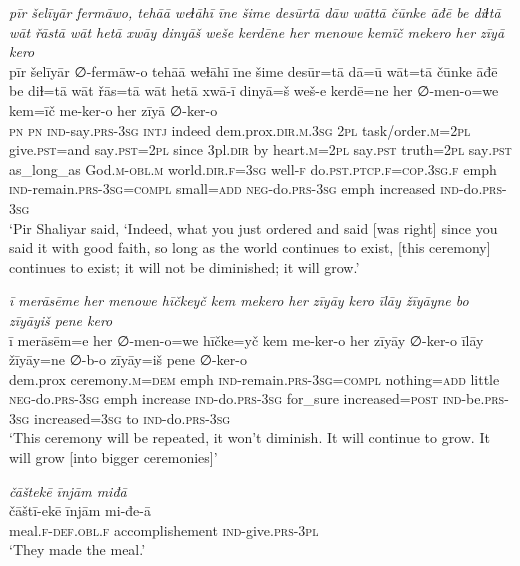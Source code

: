 \ea \label{ŽP.243}
\textit{pīr šelīyār fermāwo, tehāā weɫāhī īne šime desūrtā dāw wāttā čūnke āđē be diɫtā wāt řāstā wāt hetā xwāy dinyāš weše kerdēne her menowe kemīč mekero her zīyā kero} \\ 
\gll pīr šelīyār ∅-fermāw-o tehāā weɫāhī īne šime desūr=tā dā=ū wāt=tā čūnke āđē be diɫ=tā wāt řās=tā wāt hetā xwā-ī dinyā=š weš-e kerdē=ne her ∅-men-o=we kem=īč me-ker-o her zīyā ∅-ker-o \\ 
 \textsc{pn} \textsc{pn} \textsc{ind-}say\textsc{.prs}\textsc{-3sg} \textsc{intj} indeed dem.prox\textsc{.dir}\textsc{.m}\textsc{.3sg} \textsc{2pl} task/order\textsc{.m}=\textsc{2pl} give\textsc{.pst}=and say\textsc{.pst}=\textsc{2pl} since 3pl\textsc{.dir} by heart\textsc{.m}=\textsc{2pl} say\textsc{.pst} truth=\textsc{2pl} say\textsc{.pst} as\_long\_as God\textsc{.m}\textsc{-obl}\textsc{.m} world\textsc{.dir}\textsc{.f}\textsc{=3sg} well\textsc{-f} do\textsc{.pst}\textsc{.ptcp}\textsc{.f}\textsc{=cop}\textsc{.3sg}\textsc{.f} emph \textsc{ind-}remain\textsc{.prs}\textsc{-3sg}\textsc{=compl} small\textsc{=add} \textsc{neg-}do\textsc{.prs}\textsc{-3sg} emph increased \textsc{ind-}do\textsc{.prs}\textsc{-3sg} \\ 
\glt `Pir Shaliyar said, ‘Indeed, what you just ordered and said [was right] since you said it with good faith, so long as the world continues to exist, [this ceremony] continues to exist; it will not be diminished; it will grow.'
\z 
 
\ea \label{ŽP.245}
\textit{ī merāsēme her menowe hīčkeyč kem mekero her zīyāy kero īlāy žīyāyne bo zīyāyiš pene kero} \\ 
\gll ī merāsēm=e her ∅-men-o=we hīčke=yč kem me-ker-o her zīyāy ∅-ker-o īlāy žīyāy=ne ∅-b-o zīyāy=iš pene ∅-ker-o \\ 
 dem.prox ceremony\textsc{.m}\textsc{=dem} emph \textsc{ind-}remain\textsc{.prs}\textsc{-3sg}\textsc{=compl} nothing\textsc{=add} little \textsc{neg-}do\textsc{.prs}\textsc{-3sg} emph increase \textsc{ind-}do\textsc{.prs}\textsc{-3sg} for\_sure increased\textsc{=\textsc{post}} \textsc{ind-}be\textsc{.prs}\textsc{-3sg} increased\textsc{=3sg} to \textsc{ind-}do\textsc{.prs}\textsc{-3sg} \\ 
\glt `This ceremony will be repeated, it won’t diminish. It will continue to grow. It will grow [into bigger ceremonies]'
\z 
 
\ea \label{ŽP.254}
\textit{čāštekē īnjām miđā} \\ 
\gll čāštī-ekē īnjām mi-đe-ā \\ 
 meal\textsc{.f}\textsc{-def}\textsc{.obl}\textsc{.f} accomplishement \textsc{ind-}give\textsc{.prs}\textsc{-3pl} \\ 
\glt `They made the meal.'
\z 
 
